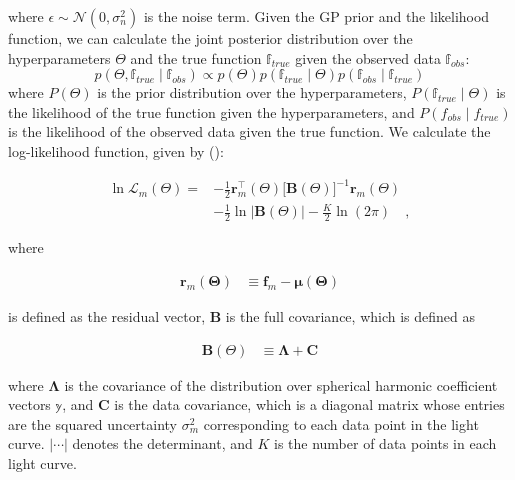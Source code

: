 \documentclass[twocolumn]{aastex631}
\begin{document}
where $\epsilon \sim \mathcal{N}(0, \sigma_n^2)$ is the noise term. Given the GP prior and the likelihood function, we can 
calculate the joint posterior distribution over the hyperparameters $\Theta$ and the true function $\mathbb{f}_{true}$ given the observed data $\mathbb{f}_{obs}$:
%
\begin{equation}
    p(\Theta, \mathbb{f}_{true} \mid \mathbb{f}_{obs}) \propto p(\Theta) p(\mathbb{f}_{true} \mid \Theta) p(\mathbb{f}_{obs} \mid \mathbb{f}_{true})
\end{equation}
%
where $P(\Theta)$ is the prior distribution over the hyperparameters, $P(\mathbb{f}_{true} \mid \Theta)$ is the likelihood of the true function given 
the hyperparameters, and $P(f_{obs} \mid f_{true})$ is the likelihood of the observed data given the true function.
We calculate the log-likelihood function, given by (\citep{Luger2021b}):
%
%
\begin{linenomath}\begin{align}
    \label{eq:log-likeRodrigo}
    \ln \mathcal{L}_m\left(\Theta\right)
    =
     & -\frac{1}{2}
    \mathbf{r}_m^\top\left(\Theta\right)
    \big[
        \pmb{B}\left(\Theta\right)
        \big]^{-1}
    \mathbf{r}_m\left(\Theta\right)
    \nonumber       \\[0.75em]
     & -
    \frac{1}{2}
    \ln \Big|
    \pmb{B}\left(\Theta\right)
    \Big|
    -
    \frac{K}{2}
    \ln \left( 2 \pi \right)
    \quad,
\end{align}\end{linenomath}
%
where
%
\begin{linenomath}\begin{align}
        \mathbf{r}_m\left(\pmb{\Theta}\right)
         & \equiv
        \mathbf{f}_m - \pmb{\mu}\left(\pmb{\Theta}\right)
    \end{align}\end{linenomath}
%
is defined as the residual vector,
%
$\pmb{B}$ is the full covariance, which is defined as 
%
\begin{linenomath}\begin{align}
    \pmb{B}\left(\Theta\right)
     & \equiv
    \pmb{\Lambda} + \pmb{C}
\end{align}\end{linenomath}
%
where $\pmb{\Lambda}$ is the covariance of the distribution over spherical harmonic coefficient
vectors $\mathbb{y}$, and $\pmb{C}$ is the data covariance, which is a diagonal
matrix whose entries are the squared uncertainty $\sigma_m^2$ corresponding to each data point in the light curve.
$| \cdots |$ denotes the determinant, and $K$ is the number of data points in
each light curve.%
\end{document}
